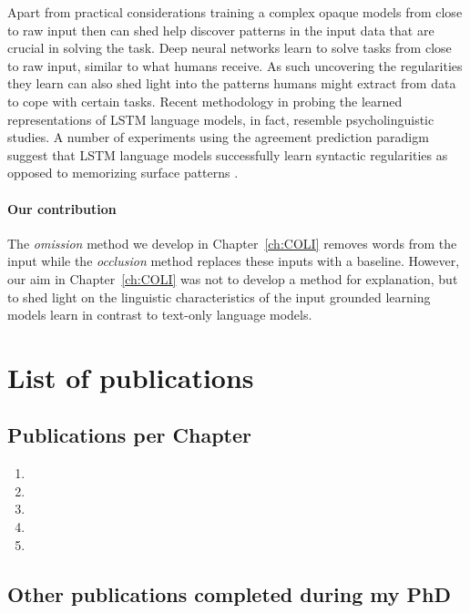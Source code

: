 Apart from practical considerations training a complex opaque models
from close to raw input then can shed help discover patterns in the
input data that are crucial in solving the task.
Deep neural networks learn to solve tasks from close to raw input, similar to
what humans receive. As such
uncovering the regularities they learn can also shed light into the patterns
humans might extract from data to cope with certain tasks.
Recent methodology in probing the learned representations of LSTM language models,
in fact, resemble psycholinguistic studies.
A number of experiments using the agreement prediction paradigm
\citep{bock1991broken} suggest that LSTM language models successfully learn
syntactic regularities as opposed to memorizing surface patterns
\citep{linzen2016assessing,enguehard2017exploring,bernardy2017using,gulordava2018colorless}.

\paragraph{Our contribution}
The \emph{omission} method we develop in Chapter~\ref{ch:COLI} removes words
from the input while the \emph{occlusion} \citep{li2016understanding}
method replaces these inputs with a baseline.
However, our aim in Chapter~\ref{ch:COLI} was not to develop a method for explanation, but to
shed light on the linguistic characteristics of the input grounded learning
models learn in contrast to text-only language models.

\section{List of publications}

\subsection{Publications per Chapter}

\begin{enumerate}
	\item {}
	\item {}
	\item {}
	\item {}
	\item \bibentry{}
\end{enumerate}

\subsection{Other publications completed during my PhD}


